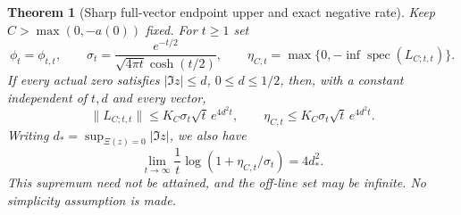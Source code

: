 \documentclass[11pt]{article}
\newtheorem{theorem}{Theorem}
\theoremstyle{remark}\newtheorem{remark}[theorem]{Remark}
\begin{document}
\begin{theorem}[Sharp full-vector endpoint upper and exact negative rate]
\label{thm:sharp-gaussian-rest-rate}
Keep $C>\max(0,-a(0))$ fixed. For $t\ge1$ set
\[
 \phi_t=\phi_{t,t},\qquad
 \sigma_t=\frac{e^{-t/2}}{\sqrt{4\pi t}\cosh(t/2)},\qquad
 \eta_{C,t}=\max\{0,-\inf\operatorname{spec}(L_{C;t,t})\}.
                                                        \tag{RGS3}
\]
If every actual zero satisfies $|\Im z|\le d$, $0\le d\le1/2$,
then, with a constant independent of $t,d$ and every vector,
\[
 \|L_{C;t,t}\|\le K_C\sigma_t\sqrt t\,e^{4d^2t},
 \qquad \eta_{C,t}\le K_C\sigma_t\sqrt t\,e^{4d^2t}.
                                                        \tag{RGS4}
\]
Writing $d_*=\sup_{\Xi(z)=0}|\Im z|$, we also have
\[
 \lim_{t\to\infty}\frac1t
           \log(1+\eta_{C,t}/\sigma_t)=4d_*^2.          \tag{RGS5}
\]
This supremum need not be attained, and the off-line set may
be infinite. No simplicity assumption is made.
\end{theorem}
\end{document}
